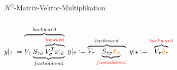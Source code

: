 \documentclass[10pt]{beamer}
\begin{document}
\begin{frame}{\(\mathcal{H}^2\)-Matrix-Vektor-Multiplikation}
  \begin{columns}
      \begin{overprint}
          \( y|_{\hat{\tau}} := \overbrace{V_{\tau} \underbrace{S_{\tau \sigma}
             \overbrace{V_{\sigma}^T
             x|_{\hat{\sigma}}}^{\textcolor{red}{\text{forward}}}}_{fastaddeval}}^{backward} \)
          \( y|_{\hat{\tau}} := \overbrace{V_{\tau} \underbrace{S_{\tau \sigma}
             \textcolor{orange}{\hat{x}_\sigma}}_{\textcolor{red}{fastaddeval}}}^{backward} \)
           \( y|_{\hat{\tau}} := \overbrace{V_{\tau}
              \textcolor{orange}{\hat{y}_\tau}}^{\textcolor{red}{backward}} \)
      \end{overprint}


\end{columns}
\end{frame}
\end{document}
